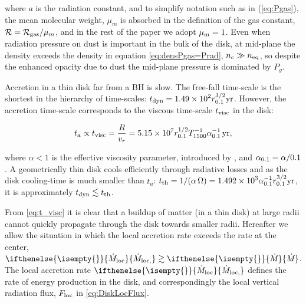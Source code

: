 \documentclass[12pt,english,preprint]{aastex}
\newcommand{\su}[2]{#1_{\rm #2}}
\newcommand{\mdt}[1][]{ 
  \ifthenelse{\isempty{#1}}
  {\dot{M}_{\rm loc}}
  { {\dot M}_{\rm{loc},{#1}} } 
  } %
\newcommand{\Mdt}[1][]{ 
    \ifthenelse{\isempty{#1}}
    {\dot{M}_{}}
    { {\dot M}_{{#1}} } 
} %
\begin{document}
\noindent where $a$ is the radiation constant, and to simplify notation such as in (\ref{eq:Pgas}), the mean molecular weight,
$\mu_m$ is absorbed in the definition of the gas constant,
${\cal R}=\su{{\cal R}}{gas}/\mu_m$, and in the rest of the
paper we adopt $\mu_{{\rm m}}=1$.  Even when radiation pressure on dust is important in the bulk of the disk, at mid-plane the density exceeds the density in equation \ref{eq:densPgas=Prad}, 
$n_c\gg \su{n}{eq}$,  so despite the enhanced opacity due to dust the mid-plane pressure is dominated by $P_{g}$.



Accretion in a thin disk far  from
a BH is slow. The free-fall time-scale is the shortest in the hierarchy of time-scales: 
$\displaystyle t_{{\rm dyn}}=1.49\times10^{2}r_{0.1}^{3/2}{\rm yr}$. 
However, the accretion time-scale corresponds to the viscous time-scale $t_{{\rm visc}}$ in the disk:

\begin{equation}
  t_{{\rm a}}\propto t_{{\rm visc}}=\frac{R}{v_{r}}=
  5.15\times10^{7}r_{0.1}^{1/2}T_{1500}^{-1}\alpha_{0.1}^{-1}\,\text{yr},\label{eq:t_visc}
\end{equation}

\noindent where $\alpha<1$ is the effective viscosity parameter, introduced
by \cite{ShakuraDiskModelGasAccretionRelativistic1972},
and $\su{\alpha}{0.1} = \alpha/0.1$. 
A geometrically thin disk cools efficiently through
radiative losses and as the disk cooling-time is much smaller
than $t_{a}$: 
$\displaystyle t_{{\rm th}}=1/(\alpha\,\Omega)=1.492\times10^{3}\alpha_{0.1}^{-1}r_{0.1}^{3/2}{\rm yr}$,
it is  approximately $\su{t}{dyn}\lesssim \su{t}{th}$.

From \eqref{eq:t_visc} it is clear that a buildup of matter (in a thin disk) at large radii 
cannot quickly propagate through the disk towards smaller radii. 
Hereafter we allow the situation in which the local accretion rate exceeds the 
rate at the center, $\mdt\gtrsim\Mdt$. 
The local accretion rate $\mdt$ defines the rate of energy production in the disk, and 
correspondingly the local vertical radiation flux, $\su{F}{loc}$ in \eqref{eq:DiskLocFlux}.



\end{document}
